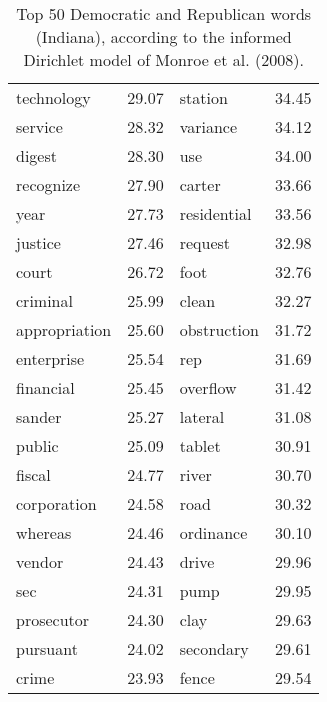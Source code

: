 \begin{table}[ht]
\begin{tabular}{lrlr}
  technology & 29.07 & station & 34.45 \\ 
  service & 28.32 & variance & 34.12 \\ 
  digest & 28.30 & use & 34.00 \\ 
  recognize & 27.90 & carter & 33.66 \\ 
  year & 27.73 & residential & 33.56 \\ 
  justice & 27.46 & request & 32.98 \\ 
  court & 26.72 & foot & 32.76 \\ 
  criminal & 25.99 & clean & 32.27 \\ 
  appropriation & 25.60 & obstruction & 31.72 \\ 
  enterprise & 25.54 & rep & 31.69 \\ 
  financial & 25.45 & overflow & 31.42 \\ 
  sander & 25.27 & lateral & 31.08 \\ 
  public & 25.09 & tablet & 30.91 \\ 
  fiscal & 24.77 & river & 30.70 \\ 
  corporation & 24.58 & road & 30.32 \\ 
  whereas & 24.46 & ordinance & 30.10 \\ 
  vendor & 24.43 & drive & 29.96 \\ 
  sec & 24.31 & pump & 29.95 \\ 
  prosecutor & 24.30 & clay & 29.63 \\ 
  pursuant & 24.02 & secondary & 29.61 \\ 
  crime & 23.93 & fence & 29.54 \\ 
   \hline
\end{tabular}
\endgroup
\caption{Top 50 Democratic and Republican words (Indiana), according to the informed Dirichlet model of Monroe et al. (2008).} 
\label{tabFightinIN}
\end{table}

